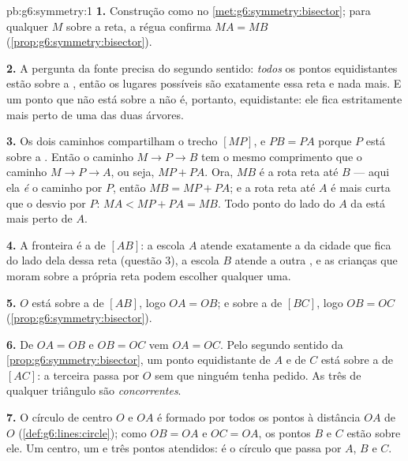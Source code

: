 \begin{solution}{pb:g6:symmetry:1}
\textbf{1.} Construção como no \cref{met:g6:symmetry:bisector}; para
qualquer $M$ sobre a reta, a régua confirma $MA = MB$
(\cref{prop:g6:symmetry:bisector}).

\textbf{2.} A pergunta da fonte precisa do segundo sentido:
\emph{todos} os pontos equidistantes estão sobre a , então os
lugares possíveis são exatamente essa reta e nada mais. E um ponto que
não está sobre a  não é, portanto, equidistante: ele fica
estritamente mais perto de uma das duas árvores.

\textbf{3.} Os dois caminhos compartilham o trecho $[MP]$, e $PB = PA$
porque $P$ está sobre a . Então o caminho $M \to P \to B$ tem
o mesmo comprimento que o caminho $M \to P \to A$, ou seja, $MP + PA$.
Ora, $MB$ é a rota reta até $B$ --- aqui ela \emph{é} o caminho por
$P$, então $MB = MP + PA$; e a rota reta até $A$ é mais curta que o
desvio por $P$: $MA < MP + PA = MB$. Todo ponto do lado do $A$ da
 está mais perto de $A$.

\textbf{4.} A fronteira é a  de $[AB]$: a escola $A$ atende
exatamente a  da cidade que fica do lado dela dessa reta (questão
3), a escola $B$ atende a outra , e as crianças que moram sobre a
própria reta podem escolher qualquer uma.

\textbf{5.} $O$ está sobre a  de $[AB]$, logo $OA = OB$; e
sobre a  de $[BC]$, logo $OB = OC$
(\cref{prop:g6:symmetry:bisector}).

\textbf{6.} De $OA = OB$ e $OB = OC$ vem $OA = OC$. Pelo segundo
sentido da \cref{prop:g6:symmetry:bisector}, um ponto equidistante de
$A$ e de $C$ está sobre a  de $[AC]$: a terceira 
passa por $O$ sem que ninguém tenha pedido. As três  de
qualquer triângulo são \emph{concorrentes}.

\textbf{7.} O círculo de centro $O$ e  $OA$ é formado por todos os
pontos à distância $OA$ de $O$ (\cref{def:g6:lines:circle}); como
$OB = OA$ e $OC = OA$, os pontos $B$ e $C$ estão sobre ele. Um centro,
um  e três pontos atendidos: é o círculo que passa por $A$, $B$ e
$C$.


\end{solution}
